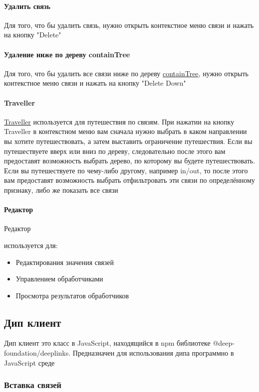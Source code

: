 \documentclass{article}
\begin{document}
\paragraph{Удалить связь}
Для того, что бы удалить связь, нужно открыть контекстное меню связи и нажать
на кнопку "Delete"
\paragraph{Удаление ниже по дереву
  containTree}\hypertarget{containTree.Deletion.Example}{}
Для того, что бы удалить все связи ниже по дереву
\hyperlink{containTree.Def}{containTree}, нужно открыть контекстное меню связи
и нажать на кнопку "Delete Down"
\paragraph*{Traveller}
\hyperlink{Traveller.Def}{Traveller} используется для путешествия по связям.
При нажатии на кнопку Traveller в контекстном меню вам сначала нужно выбрать в
каком направлении вы хотите путешествовать, а затем выставить ограничение
путешествия.
Если вы путешествуете вверх или вниз по дереву, следовательно после этого вам
предоставят возможность выбрать дерево, по которому вы будете путешествовать.
Если вы путешествуете по чему-либо другому, например in/out, то после этого вам
предоставят возможность выбрать отфильтровать эти связи по определённому
признаку, либо же показать все связи
\paragraph*{Редактор}
\hypertarget{Editor.Def}{Редактор} используется для:
\begin{itemize}
  \item Редактирования значения связей
  \item Управлением обработчиками
  \item Просмотра результатов обработчиков
\end{itemize}

\subsection{Дип клиент}
Дип клиент это класс в JavaScript, находящийся в npm библиотеке
@deep-foundation/deeplinks. Предназначен для использования дипа
программно в JavaScript среде

\subsubsection{Вставка связей}
\end{document}
